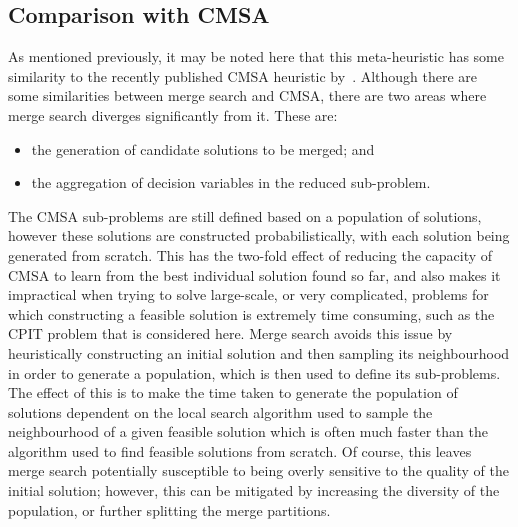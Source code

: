 \documentclass[journal]{IEEEtran}
\begin{document}
\subsection{Comparison with CMSA}
As mentioned previously, it may be noted here that this meta-heuristic has some similarity to the recently published CMSA heuristic by~\cite{cmsa}. Although there are some similarities between merge search and CMSA, there are two areas where merge search diverges significantly from it. These are:
\begin{itemize}
\item the generation of candidate solutions to be merged; and
\item the aggregation of decision variables in the reduced sub-problem.
\end{itemize}
The CMSA sub-problems are still defined based on a population of solutions, however these solutions are constructed probabilistically, with each solution being generated from scratch. This has the two-fold effect of reducing the capacity of CMSA to learn from the best individual solution found so far, and also makes it impractical when trying to solve large-scale, or very complicated, problems for which constructing a feasible solution is extremely time consuming, such as the CPIT problem that is considered here. Merge search avoids this issue by heuristically constructing an initial solution and then sampling its neighbourhood in order to generate a population, which is then used to define its sub-problems. The effect of this is to make the time taken to generate the population of solutions dependent on the local search algorithm used to sample the neighbourhood of a given feasible solution which is often much faster than the algorithm used to find feasible solutions from scratch. Of course, this leaves merge search potentially susceptible to being overly sensitive to the quality of the initial solution; however, this can be mitigated by increasing the diversity of the population, or further splitting the merge partitions. 
\end{document}
